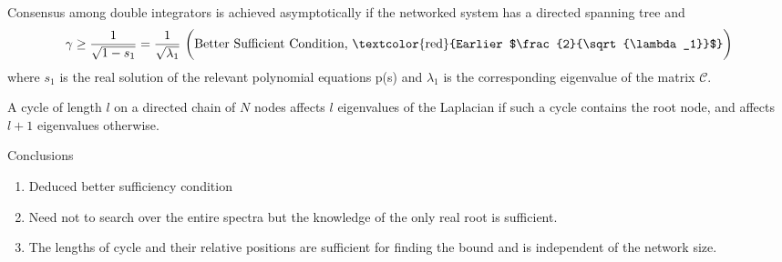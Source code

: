\begin{subframe}
	\vspace{-0.1cm}
	\begin{theorem}\label{BetterSuff}
		Consensus among double integrators is achieved asymptotically if the networked system has a directed spanning tree and \\
		\begin{equation*}\label{new-sufficiency}
			\gamma \geq \frac{1}{\sqrt{1-s_1}}=\frac{1}{\sqrt{\lambda_1}} \text{  \bigg(Better Sufficient Condition, \textcolor{red}{Earlier $\frac{2}{\sqrt{\lambda_1}}$}\bigg)}
		\end{equation*}	
		where $s_1$ is the real solution of the relevant polynomial equations p(s) and $\lambda_1$ is the corresponding eigenvalue of the matrix $\mathcal{C}$. %
		\hyperlink{LapStruct}{}
	\end{theorem}	
	\vspace{-0.2cm}
	\begin{theorem}
		A cycle of length $l$ on a directed chain of $N$ nodes affects $l$ eigenvalues of the Laplacian if such a cycle contains the root node, and affects $l+1$ eigenvalues otherwise.
	\end{theorem}
	\vspace{-0.2cm}
	\begin{block}{Conclusions}
		\begin{enumerate}
			\item Deduced better sufficiency condition
			\item Need not to search over the entire spectra but the knowledge of the only real root is sufficient.
			\item The lengths of cycle and their relative positions are sufficient for finding the bound and is independent of the network size. \hyperlink{Conc:Approach1}{}
		\end{enumerate}
	\end{block}
	
\end{subframe}
